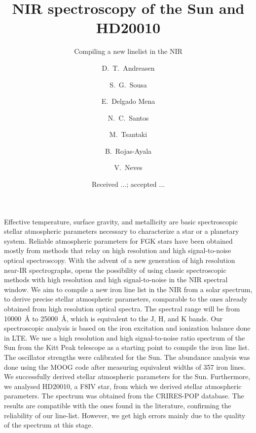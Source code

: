 \documentclass{aa}
\begin{document}
\title{NIR spectroscopy of the Sun and HD20010}
\subtitle{Compiling a new linelist in the NIR}


\author{ D.~T.~Andreasen
    \and S.~G.~Sousa
    \and E.~Delgado Mena
    \and N.~C.~Santos
    \and M.~Tsantaki
    \and B.~Rojas-Ayala
    \and V.~Neves}







\date{Received ...; accepted ...}

\abstract
{Effective temperature, surface gravity, and metallicity are basic
spectroscopic stellar atmospheric parameters necessary to characterize
a star or a planetary system. Reliable atmospheric parameters for
FGK stars have been obtained mostly from methods that relay on high
resolution and high signal-to-noise optical spectroscopy. With the
advent of a new generation of high resolution near-IR spectrographs,
opens the possibility of using classic spectroscopic methods with
high resolution and high signal-to-noise in the NIR spectral window.}
{We aim to compile a new iron line list in the NIR from a solar
spectrum, to derive precise stellar atmospheric parameters,
comparable to the ones already obtained from high resolution optical
spectra. The spectral range will be from \SI{10000}{\angstrom} to
\SI{25000}{\angstrom}, which is equivalent to the J, H, and K bands.}
{Our spectroscopic analysis is based on the iron excitation and
ionization balance done in LTE. We
use a high resolution and high signal-to-noise ratio spectrum of the Sun
from the Kitt Peak telescope as a starting point to compile the iron
line list. The oscillator strengths were calibrated for the Sun.
The abundance analysis was done using
the MOOG code after measuring equivalent widths of 357 iron lines. }
{We successfully derived stellar atmospheric parameters for the
Sun.
Furthermore, we analysed
HD20010, a F8IV star, from which we derived stellar atmospheric
parameters. The spectrum was obtained from the CRIRES-POP database.
The results are compatible with the ones found in the literature,
confirming the reliability of our line-list. However, we get high
errors mainly due to the quality of the spectrum at this stage.}
{}
\end{document}
